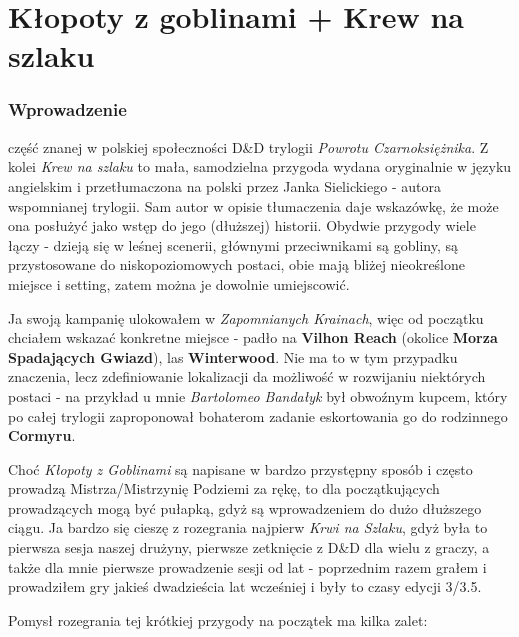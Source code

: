 \clearpage

\part{Kłopoty z goblinami + Krew na szlaku}

\begin{twocolumn}

\section{Wprowadzenie}

 część znanej w polskiej społeczności D\&D
trylogii \emph{Powrotu Czarnoksiężnika}. Z kolei \emph{Krew na szlaku}\cite{krew_na_szlaku} to mała, samodzielna
przygoda wydana oryginalnie w języku angielskim i przetłumaczona na polski przez Janka Sielickiego - autora wspomnianej
trylogii. Sam autor w opisie tłumaczenia daje wskazówkę, że może ona posłużyć jako wstęp do jego (dłuższej) historii.
Obydwie przygody wiele łączy - dzieją się w leśnej scenerii, głównymi przeciwnikami są gobliny, są przystosowane do
niskopoziomowych postaci, obie mają bliżej nieokreślone miejsce i setting, zatem można je dowolnie umiejscowić.

Ja swoją kampanię ulokowałem w \emph{Zapomnianych Krainach}, więc od początku chciałem wskazać konkretne miejsce - padło
na \textbf{Vilhon Reach} (okolice \textbf{Morza Spadających Gwiazd}), las \textbf{Winterwood}. Nie ma to w tym przypadku
znaczenia, lecz zdefiniowanie lokalizacji da możliwość w rozwijaniu niektórych postaci - na przykład u mnie
\emph{Bartolomeo Bandałyk} był obwoźnym kupcem, który po całej trylogii zaproponował bohaterom zadanie eskortowania go
do rodzinnego \textbf{Cormyru}.

Choć \emph{Kłopoty z Goblinami} są napisane w bardzo przystępny sposób i często prowadzą Mistrza/Mistrzynię Podziemi za
rękę, to dla początkujących prowadzących mogą być pułapką, gdyż są wprowadzeniem do dużo dłuższego ciągu. Ja bardzo się
cieszę z rozegrania najpierw \emph{Krwi na Szlaku}, gdyż była to pierwsza sesja naszej drużyny, pierwsze zetknięcie z
D\&D dla wielu z graczy, a także dla mnie pierwsze prowadzenie sesji od lat - poprzednim razem grałem i prowadziłem gry
jakieś dwadzieścia lat wcześniej i były to czasy edycji 3/3.5.

Pomysł rozegrania tej krótkiej przygody na początek ma kilka zalet:


\end{twocolumn}
